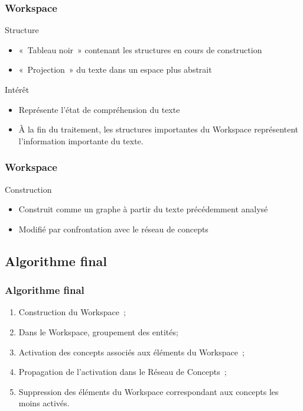 \documentclass[12pt, handout]{beamer}
\begin{document}
\begin{frame}
  \frametitle{Workspace}

  \begin{block}{Structure}
    \begin{itemize}
      \item «~Tableau noir~» contenant les structures en cours de construction
      \item «~Projection~» du texte dans un espace plus abstrait
    \end{itemize}
  \end{block}
  \begin{block}{Intérêt}
    \begin{itemize}
      \item Représente l'état de compréhension du texte
      \item À la fin du traitement, les structures importantes du Workspace représentent l'information importante du texte.
    \end{itemize}
  \end{block}

\end{frame}

\begin{frame}
  \frametitle{Workspace}
 
  \begin{block}{Construction}
    \begin{itemize}
      \item Construit comme un graphe à partir du texte précédemment analysé
      \item Modifié par confrontation avec le réseau de concepts
    \end{itemize}
  \end{block}
 
\end{frame}

\subsection{Algorithme final}

\begin{frame}
 \frametitle{Algorithme final}

 \begin{enumerate}
  \item Construction du Workspace~;
  \item Dans le Workspace, groupement des entités;
  \item Activation des concepts associés aux éléments du Workspace~;
  \item Propagation de l'activation dans le Réseau de Concepts~;
  \item Suppression des éléments du Workspace correspondant aux concepts les moins activés.
 \end{enumerate}
 
\end{frame}
\end{document}
